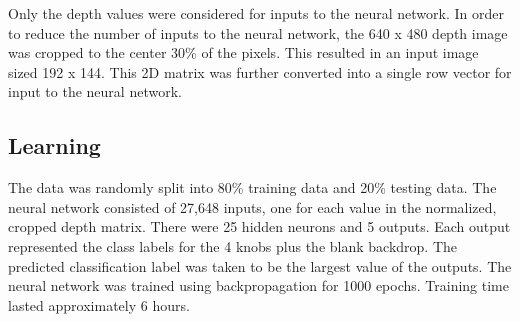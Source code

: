 \documentclass{article}
\begin{document}
Only the depth values were considered for inputs to the neural network. In order to reduce the number of inputs to the neural network, the 640 x 480 depth image was cropped to the center 30\% of the pixels. This resulted in an input image sized 192 x 144. This 2D matrix was further converted into a single row vector for input to the neural network.

\subsection{Learning}
The data was randomly split into 80\% training data and 20\% testing data. The neural network consisted of 27,648 inputs, one for each value in the normalized, cropped depth matrix.  There were 25 hidden neurons and 5 outputs. Each output represented the class labels for the 4 knobs plus the blank backdrop. The predicted classification label was taken to be the largest value of the outputs. The neural network was trained using backpropagation for 1000 epochs. Training time lasted approximately 6 hours.
\end{document}
